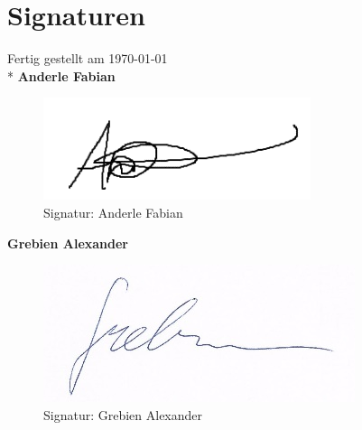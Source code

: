 \newcommand{\german}{true} %
\newcommand{\coloredTitlePage}{true} %
\newcommand{\company}{false}
\newcommand{\ECE}{true}

\usepackage{hyperref}

\makeglossaries



\makeatletter
\newcommand{\myscope}[2] %
{\draw[thick,rotate=#2] (#1) circle (12pt)
 (#1) ++(-0.35,-0.1) -- ++(0.3,0.3) --++(0,-0.3)-- ++(0.3,0.3) --++(0,-0.3);
}



\frontmatter
\renewcommand{\thepage}{\Roman{page}}



\tableofcontents
\printglossary
\mainmatter






        
\newpage
\chapter{Signaturen}
    Fertig gestellt am \today
    \\*
    \textbf{Anderle Fabian}
    \begin{figure}[H]
        \centering
        \includegraphics{pics/signature_anderle.png}
    	\caption{Signatur: Anderle Fabian}
    	\label{pic:signatur_anderle}
    \end{figure}
    
    \textbf{Grebien Alexander}
    \begin{figure}[H]
        \centering
        \includegraphics{pics/signature_grebien.png}
    	\caption{Signatur: Grebien Alexander}
    	\label{pic:signatur_grebien}
    \end{figure}
        
\listoffigures
\listoftables

